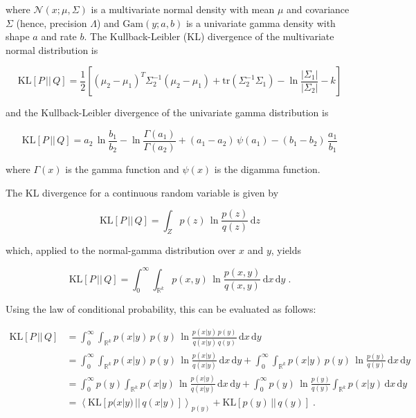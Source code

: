 where $\mathcal{N}(x; \mu, \Sigma)$ is a multivariate normal density with mean $\mu$ and covariance $\Sigma$ (hence, precision $\Lambda$) and $\mathrm{Gam}(y; a, b)$ is a univariate gamma density with shape $a$ and rate $b$. The Kullback-Leibler (KL) divergence of the multivariate normal distribution is

\begin{equation} \label{eq:mvn-KL}
\mathrm{KL}[P\,||\,Q] = \frac{1}{2} \left[ (\mu_2 - \mu_1)^T \Sigma_2^{-1} (\mu_2 - \mu_1) + \mathrm{tr}(\Sigma_2^{-1} \Sigma_1) - \ln \frac{|\Sigma_1|}{|\Sigma_2|} - k \right]
\end{equation}

and the Kullback-Leibler divergence of the univariate gamma distribution is

\begin{equation} \label{eq:gam-KL}
\mathrm{KL}[P\,||\,Q] = a_2 \, \ln \frac{b_1}{b_2} - \ln \frac{\Gamma(a_1)}{\Gamma(a_2)} + (a_1 - a_2) \, \psi(a_1) - (b_1 - b_2) \, \frac{a_1}{b_1}
\end{equation}

where $\Gamma(x)$ is the gamma function and $\psi(x)$ is the digamma function.

\vspace{1em}
The KL divergence for a continuous random variable is given by 

\begin{equation} \label{eq:KL-cont}
\mathrm{KL}[P\,||\,Q] = \int_{Z} p(z) \, \ln \frac{p(z)}{q(z)} \, \mathrm{d}z
\end{equation}

which, applied to the normal-gamma distribution over $x$ and $y$, yields

\begin{equation} \label{eq:NG-KL0}
\mathrm{KL}[P\,||\,Q] = \int_{0}^{\infty} \int_{\mathbb{R}^k} p(x,y) \, \ln \frac{p(x,y)}{q(x,y)} \, \mathrm{d}x \, \mathrm{d}y \; .
\end{equation}

Using the law of conditional probability, this can be evaluated as follows:

\vspace{-0.5em}
\begin{equation} \label{eq:NG-KL1}
\begin{split}
\mathrm{KL}[P\,||\,Q] &= \int_{0}^{\infty} \int_{\mathbb{R}^k} p(x|y) \, p(y) \, \ln \frac{p(x|y) \, p(y)}{q(x|y) \, q(y)} \, \mathrm{d}x \, \mathrm{d}y \\
&= \int_{0}^{\infty} \int_{\mathbb{R}^k} p(x|y)\, p(y) \, \ln \frac{p(x|y)}{q(x|y)} \, \mathrm{d}x \, \mathrm{d}y + \int_{0}^{\infty} \int_{\mathbb{R}^k} p(x|y)\, p(y) \, \ln \frac{p(y)}{q(y)} \, \mathrm{d}x \, \mathrm{d}y \\
&= \int_{0}^{\infty} p(y) \int_{\mathbb{R}^k} p(x|y) \, \ln \frac{p(x|y)}{q(x|y)} \, \mathrm{d}x \, \mathrm{d}y + \int_{0}^{\infty} p(y) \, \ln \frac{p(y)}{q(y)} \int_{\mathbb{R}^k} p(x|y) \, \mathrm{d}x \, \mathrm{d}y \\
&= \left\langle \mathrm{KL}[p(x|y)\,||\,q(x|y)] \right\rangle_{p(y)} + \mathrm{KL}[p(y)\,||\,q(y)] \; .
\end{split}
\end{equation}

